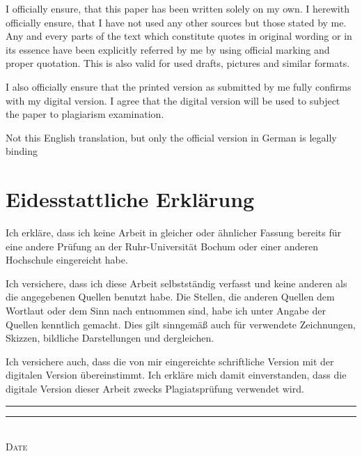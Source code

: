 \noindent
I officially ensure, that this paper has been written solely on my own.
I herewith officially ensure, that I have not used any other sources but those stated by me.
Any and every parts of the text which constitute quotes in original wording or in its essence have been explicitly referred by me by using official marking and proper quotation.
This is also valid for used drafts, pictures and similar formats.

\noindent
I also officially ensure that the printed version as submitted by me fully confirms with my digital version.
I agree that the digital version will be used to subject the paper to plagiarism examination.

\noindent
Not this English translation, but only the official version in German is legally binding

\section*{Eidesstattliche Erklärung}
{
Ich erkläre, dass ich keine Arbeit in gleicher oder ähnlicher Fassung bereits für eine andere Prüfung an der Ruhr-Universität Bochum oder einer anderen Hochschule eingereicht habe.

\noindent
Ich versichere, dass ich diese Arbeit selbstständig verfasst und keine anderen als die angegebenen Quellen benutzt habe. Die Stellen, die anderen Quellen dem Wortlaut oder dem Sinn nach entnommen sind, habe ich unter Angabe der Quellen kenntlich gemacht.
Dies gilt sinngemäß auch für verwendete Zeichnungen, Skizzen, bildliche Darstellungen und dergleichen.

\noindent
Ich versichere auch, dass die von mir eingereichte schriftliche Version mit der digitalen Version übereinstimmt.
Ich erkläre mich damit einverstanden, dass die digitale Version dieser Arbeit zwecks Plagiatsprüfung verwendet wird.\@}

\makeatletter
\vspace{2cm}
\rule{4cm}{0.1pt} \hfill \rule{7cm}{0.1pt} \\
\hspace*{1.5cm} \textsc{Date} \hspace*{7cm} \textsc{\@author}
\makeatother

\newpage

